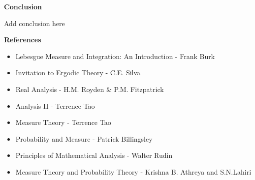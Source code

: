 \documentclass{article}
\begin{document}
\newpage
\begin{center}
    {\Large\bfseries\noindent Conclusion}
\end{center}
	Add conclusion here
\newpage
\begin{center}
    {\Large\bfseries\noindent References}
\end{center}
\begin{itemize}
    \item Lebesgue Measure and Integration: An Introduction - Frank Burk
    \item Invitation to Ergodic Theory - C.E. Silva
    \item Real Analysis - H.M. Royden \& P.M. Fitzpatrick
    \item Analysis II - Terrence Tao
    \item Measure Theory - Terrence Tao
    \item Probability and Measure - Patrick Billingsley
    \item Principles of Mathematical Analysis - Walter Rudin
    \item Measure Theory and Probability Theory - Krishna B. Athreya and S.N.Lahiri
    
\end{itemize}
\end{document}
